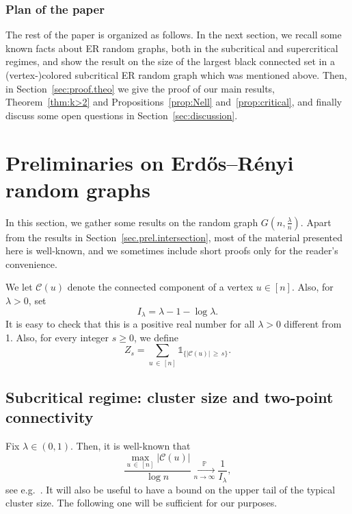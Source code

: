 \documentclass[AHL,Unicode,longabstracts,published]{cedram}
\renewcommand{\Pr}{\mathbb{P}}
\newcommand{\cC}{\mathcal{C}}
\begin{document}
\subsubsection*{Plan of the paper}
The rest of the paper is organized as follows. In the next section, we recall some known facts about ER random graphs, both in the subcritical and supercritical regimes, and show the result on the size of the largest black connected set in a (vertex-)colored subcritical ER random graph which was mentioned above. Then, in Section~\ref{sec:proof.theo} we give the proof of our main results, Theorem~\ref{thm:k>2} and Propositions~\ref{prop:Nell} and~\ref{prop:critical}, and finally discuss some open questions in Section~\ref{sec:discussion}.

\section{\texorpdfstring{Preliminaries on Erd\H{o}s--Rényi random graphs}{}}

In this section, we gather some results on the random graph $G(n,\tfrac \lambda n)$. Apart from the results in Section~\ref{sec.prel.intersection}, most of the material presented here is well-known, and we sometimes include short proofs only for the reader's convenience.

We let $\cC(u)$ denote the connected component of a vertex $u \in [n]$. Also, for $\lambda>0$, set
\begin{equation}\label{def.Ilambda}
I_\lambda = \lambda- 1 - \log \lambda.
\end{equation}
It is easy to check that this is a positive real number for all $\lambda>0$ different from 1. Also, for every integer $s\ge 0$, we define
\[
Z_s = \sum_{u\,\in\,[n]} \mathds{1}_{\{|\cC(u)|\,\ge\, s\}}.
\]


\subsection{Subcritical regime: cluster size and two-point connectivity} Fix $\lambda\in (0,1)$. Then, it is well-known that
\begin{equation}\label{LLN.subcritical}
\frac{\max_{u\,\in\,[n]} |\cC(u)|}{\log n} \xrightarrow[n\to \infty]{\Pr} \frac 1{I_\lambda},
\end{equation}
see e.g.~\cite[Theorems~4.4 and 4.5]{Hof16}. It will also be useful to have a bound on the upper tail of the typical cluster size. The following one will be sufficient for our purposes.
\end{document}
